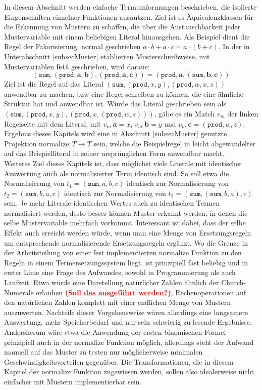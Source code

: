 \documentclass{scrartcl}
\numberwithin{figure}{section} %
\theoremstyle{definition} %
\newcommand{\BFred}[1]{\textbf{\textcolor{red}{#1}}}
\begin{document}
In diesem Abschnitt werden einfache Termumformungen beschrieben, die isolierte Eingenschaften einzelner Funktionen ausnutzen. Ziel ist es Äquivalenzklassen für die Erkennung von Mustern zu schaffen, die über die Austauschbarkeit jeder Mustervariable mit einem beliebigen Literal hinausgehen. Als Beispiel dient die Regel der Fakorisierung, normal geschrieben $a \cdot b + a \cdot c = a \cdot (b + c)$. In der in Unterabschnitt \ref{subsecMuster} etablierten Musterschreibweise, mit Mustervariablen \textbf{fett} geschrieben, wird daraus:
$$(\texttt{sum}, (\texttt{prod}, \mathbf a, \mathbf b), (\texttt{prod}, \mathbf a, \mathbf c)) = (\texttt{prod}, \mathbf a, (\texttt{sum}, \mathbf b, \mathbf c))$$
Ziel ist die Regel auf das Literal $(\texttt{sum}, (\texttt{prod}, x, y), (\texttt{prod}, w, x, z))$ anwendbar zu machen, bzw eine Regel schreiben zu können, die eine ähnliche Struktur hat und anwendbar ist. 
Würde das Literal geschrieben sein als $(\texttt{sum}, (\texttt{prod}, x, y), (\texttt{prod}, x, (\texttt{prod}, w, z)))$, gäbe es ein Match $v_m$ der linken Regelseite mit dem Literal, mit $v_m~\mathbf a = x$, $v_m~\mathbf b = y$ und $v_m~\mathbf c = (\texttt{prod}, w, z)$. Ergebnis dieses Kapitels wird eine in Abschnitt \ref{subsecMuster} genutzte Projektion ${\mathrm{normalize} \colon T \rightarrow T}$ sein, welche die Beispielregel in leicht abgewandelter auf das Beispielliteral in seiner ursprünglichen Form anwendbar macht.\\

Weiteres Ziel dieses Kapitels ist, dass möglichst viele Literale mit identischer Auswertung auch als normalisierter Term identisch sind. So soll etwa die Normalisierung von $t_1 = (\texttt{sum}, a, b, c)$ identisch zur Normalisierung von $t_2 = (\texttt{sum}, b, a, c)$ identisch zur Normalisierung von $t_3 = (\texttt{sum}, (\texttt{sum}, b, a), c)$ sein. Je mehr Literale identischen Wertes auch zu identischen Termen normalisiert werden, desto besser können Muster erkannt werden, in denen die selbe Mustervariable mehrfach vorkommt. Interessant ist dabei, dass der selbe Effekt auch erreicht werden würde, wenn man eine Menge von Ersetzungsregeln um entsprechende normalisierende Ersetzungsregeln ergänzt. Wo die Grenze in der Arbeitsteilung von einer fest implementierten $\mathrm{normalize}$ Funktion zu den Regeln in einem Termersetzungssystem liegt, ist prinzipiell fast beliebig und in erster Linie eine Frage des Aufwandes, sowohl in Programmierung als auch Laufzeit. Etwa würde eine Darstellung natürlicher Zahlen ähnlich der Church-Numerale erlauben \BFred{(Soll das ausgeführt werden?)}, Rechenoperationen auf den natürlichen Zahlen komplett mit einer endlichen Menge von Mustern auszuwerten. Nachteile dieser Vorgehensweise wären allerdings eine langsamere Auswertung, mehr Speicherbedarf und nur sehr schwierig zu lesende Ergebnisse. Andersherum wäre etwa die Anwendung der ersten binomischen Formel prinzipiell auch in der $\mathrm{normalize}$ Funktion möglich, allerdings steht der Aufwand manuell  auf das Muster zu testen nur möglicherweise minimalen Geschwindigkeitsvorteilen gegenüber. Die Transformationen, die in diesem Kapitel der $\mathrm{normalize}$ Funktion zugewiesen werden, sollen also idealerweise nicht einfacher mit Mustern implementierbar sein.\\
\end{document}
